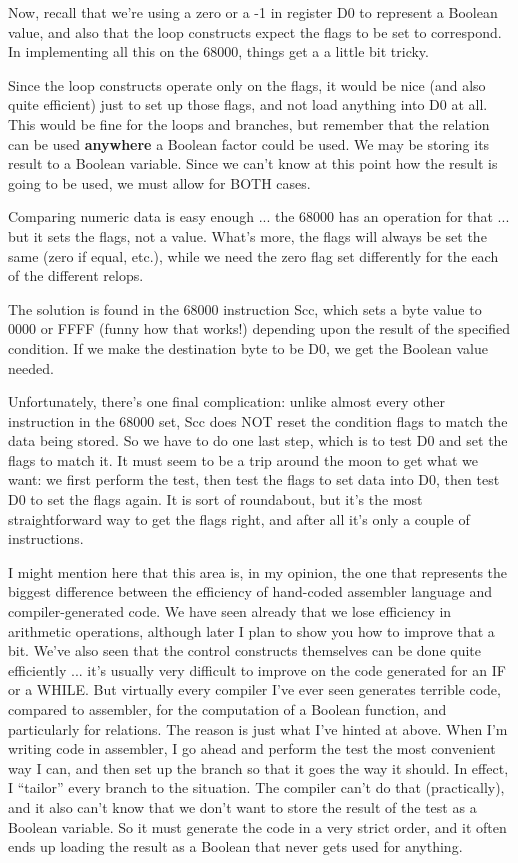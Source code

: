 Now, recall  that  we're  using  a zero or a -1 in register D0 to represent  a Boolean value, and also  that  the  loop  constructs expect the flags to be set to correspond. In  implementing  all this on the 68000, things get a a little bit tricky.

Since the loop constructs operate only on the flags, it  would be nice (and also quite  efficient)  just to set up those flags, and not load  anything  into  D0  at all. This would be fine for the loops  and  branches, but remember that the relation can be used {\bfseries anywhere} a Boolean factor could be  used. We may be storing its result to a Boolean variable. Since we can't know at  this point how the result is going to be used, we must allow for BOTH cases.

Comparing numeric data  is  easy  enough  ... the  68000  has an operation  for  that ... but it sets  the  flags, not  a  value. What's more, the  flags  will  always  be  set the same (zero if equal, etc.), while we need the zero flag set differently for the each of the different relops.

The solution is found in the 68000 instruction Scc, which  sets a byte value to 0000 or FFFF (funny how that works!) depending upon the  result  of  the  specified   condition. If  we  make  the destination byte to be D0, we get the Boolean value needed.

Unfortunately, there's one  final  complication:  unlike  almost every other instruction in the 68000 set, Scc does NOT  reset the condition flags to match the data being stored. So we have to do one last step, which is to test D0 and set the flags to match it. It must seem to be a trip around the moon to get what we want: we first perform the test, then test the flags to set data  into D0, then test D0 to set the flags again. It  is  sort of roundabout, but it's the most straightforward way to get the flags right, and after all it's only a couple of instructions.

I  might  mention  here that this area is, in my opinion, the one that represents the biggest difference between the  efficiency of hand-coded assembler language and  compiler-generated  code. We have  seen  already  that  we  lose   efficiency   in  arithmetic operations, although later I plan to show you how to improve that a  bit. We've also seen that the control constructs themselves can be done quite efficiently  ... it's usually very difficult to improve  on  the  code generated for an  IF  or  a  WHILE. But virtually every compiler I've ever seen generates  terrible code, compared to assembler, for the computation of a Boolean function, and particularly for relations. The  reason  is just what I've hinted at above. When I'm writing code in assembler, I  go ahead and perform the test the most convenient way I can, and  then set up the branch so that it goes the way it should. In  effect, I ``tailor''  every  branch  to the situation. The compiler can't do that (practically), and it also can't know that we don't  want to store the result of the test as a Boolean variable. So it must generate  the  code  in a very strict order, and it often ends up loading  the  result  as  a  Boolean  that  never gets  used  for anything.


